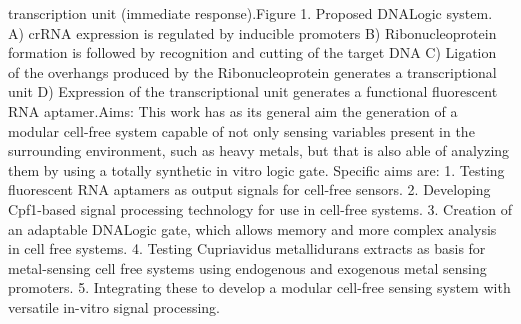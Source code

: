 transcription unit (immediate response).Figure 1. Proposed DNALogic system. A) crRNA expression is regulated by inducible promoters B)
Ribonucleoprotein formation is followed by recognition and cutting of the target DNA C) Ligation of the
overhangs produced by the Ribonucleoprotein generates a transcriptional unit D) Expression of the
transcriptional unit generates a functional fluorescent RNA aptamer.Aims:
This work has as its general aim the generation of a modular cell-free system capable of not only sensing
variables present in the surrounding environment, such as heavy metals, but that is also able of analyzing
them by using a totally synthetic in vitro logic gate.
Specific aims are:
1. Testing fluorescent RNA aptamers as output signals for cell-free sensors.
2. Developing Cpf1-based signal processing technology for use in cell-free systems.
3. Creation of an adaptable DNALogic gate, which allows memory and more complex analysis in cell free
systems.
4. Testing Cupriavidus metallidurans extracts as basis for metal-sensing cell free systems using
endogenous and exogenous metal sensing promoters.
5. Integrating these to develop a modular cell-free sensing system with versatile in-vitro signal processing.
